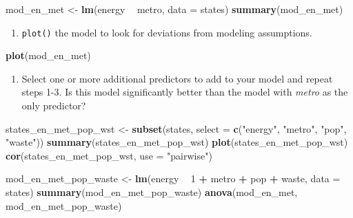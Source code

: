 \documentclass[
]{book}
\newenvironment{Shaded}{\begin{snugshade}}{\end{snugshade}}
\newcommand{\DataTypeTok}[1]{\textcolor[rgb]{0.13,0.29,0.53}{#1}}
\newcommand{\DecValTok}[1]{\textcolor[rgb]{0.00,0.00,0.81}{#1}}
\newcommand{\KeywordTok}[1]{\textcolor[rgb]{0.13,0.29,0.53}{\textbf{#1}}}
\newcommand{\NormalTok}[1]{#1}
\newcommand{\OperatorTok}[1]{\textcolor[rgb]{0.81,0.36,0.00}{\textbf{#1}}}
\newcommand{\StringTok}[1]{\textcolor[rgb]{0.31,0.60,0.02}{#1}}
\providecommand{\tightlist}{%
  \setlength{\itemsep}{0pt}\setlength{\parskip}{0pt}}
\begin{document}
\begin{Shaded}
\begin{Highlighting}[]
\NormalTok{  mod_en_met <-}\StringTok{ }\KeywordTok{lm}\NormalTok{(energy }\OperatorTok{~}\StringTok{ }\NormalTok{metro, }\DataTypeTok{data =}\NormalTok{ states)}
  \KeywordTok{summary}\NormalTok{(mod_en_met)}
\end{Highlighting}
\end{Shaded}

\begin{enumerate}
\def\labelenumi{\arabic{enumi}.}
\setcounter{enumi}{2}
\tightlist
\item
  \texttt{plot()} the model to look for deviations from modeling assumptions.
\end{enumerate}

\begin{Shaded}
\begin{Highlighting}[]
  \KeywordTok{plot}\NormalTok{(mod_en_met)}
\end{Highlighting}
\end{Shaded}

\begin{enumerate}
\def\labelenumi{\arabic{enumi}.}
\setcounter{enumi}{3}
\tightlist
\item
  Select one or more additional predictors to add to your model and repeat steps 1-3. Is this model significantly better than the model with \emph{metro} as the only predictor?
\end{enumerate}

\begin{Shaded}
\begin{Highlighting}[]
\NormalTok{  states_en_met_pop_wst <-}\StringTok{ }\KeywordTok{subset}\NormalTok{(states, }\DataTypeTok{select =} \KeywordTok{c}\NormalTok{(}\StringTok{"energy"}\NormalTok{, }\StringTok{"metro"}\NormalTok{, }\StringTok{"pop"}\NormalTok{, }\StringTok{"waste"}\NormalTok{))}
  \KeywordTok{summary}\NormalTok{(states_en_met_pop_wst)}
  \KeywordTok{plot}\NormalTok{(states_en_met_pop_wst)}
  \KeywordTok{cor}\NormalTok{(states_en_met_pop_wst, }\DataTypeTok{use =} \StringTok{"pairwise"}\NormalTok{)}

\NormalTok{  mod_en_met_pop_waste <-}\StringTok{ }\KeywordTok{lm}\NormalTok{(energy }\OperatorTok{~}\StringTok{ }\DecValTok{1} \OperatorTok{+}\StringTok{ }\NormalTok{metro }\OperatorTok{+}\StringTok{ }\NormalTok{pop }\OperatorTok{+}\StringTok{ }\NormalTok{waste, }\DataTypeTok{data =}\NormalTok{ states)}
  \KeywordTok{summary}\NormalTok{(mod_en_met_pop_waste)}
  \KeywordTok{anova}\NormalTok{(mod_en_met, mod_en_met_pop_waste)}
\end{Highlighting}
\end{Shaded}
\end{document}
